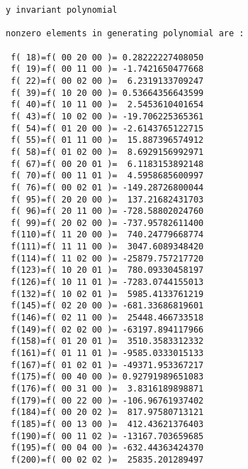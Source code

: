 \begin{footnotesize}
\begin{verbatim}
y invariant polynomial

nonzero elements in generating polynomial are :

 f( 18)=f( 00 20 00 )= 0.28222227408050
 f( 19)=f( 00 11 00 )= -1.7421650477668
 f( 22)=f( 00 02 00 )=  6.2319133709247
 f( 39)=f( 10 20 00 )= 0.53664356643599
 f( 40)=f( 10 11 00 )=  2.5453610401654
 f( 43)=f( 10 02 00 )= -19.706225365361
 f( 54)=f( 01 20 00 )= -2.6143765122715
 f( 55)=f( 01 11 00 )=  15.887396574912
 f( 58)=f( 01 02 00 )=  8.6929156992971
 f( 67)=f( 00 20 01 )=  6.1183153892148
 f( 70)=f( 00 11 01 )=  4.5958685600997
 f( 76)=f( 00 02 01 )= -149.28726800044
 f( 95)=f( 20 20 00 )=  137.21682431703
 f( 96)=f( 20 11 00 )= -728.58802024760
 f( 99)=f( 20 02 00 )= -737.95782611400
 f(110)=f( 11 20 00 )=  740.24779668774
 f(111)=f( 11 11 00 )=  3047.6089348420
 f(114)=f( 11 02 00 )= -25879.757217720
 f(123)=f( 10 20 01 )=  780.09330458197
 f(126)=f( 10 11 01 )= -7283.0744155013
 f(132)=f( 10 02 01 )=  5985.4133761219
 f(145)=f( 02 20 00 )= -681.33686819601
 f(146)=f( 02 11 00 )=  25448.466733518
 f(149)=f( 02 02 00 )= -63197.894117966
 f(158)=f( 01 20 01 )=  3510.3583312332
 f(161)=f( 01 11 01 )= -9585.0333015133
 f(167)=f( 01 02 01 )= -49371.953367217
 f(175)=f( 00 40 00 )= 0.92791989651083
 f(176)=f( 00 31 00 )=  3.8316189898871
 f(179)=f( 00 22 00 )= -106.96761937402
 f(184)=f( 00 20 02 )=  817.97580713121
 f(185)=f( 00 13 00 )=  412.43621376403
 f(190)=f( 00 11 02 )= -13167.703659685
 f(195)=f( 00 04 00 )= -632.44363424370
 f(200)=f( 00 02 02 )=  25835.201289497

\end{verbatim}
\end{footnotesize}

\newpage
